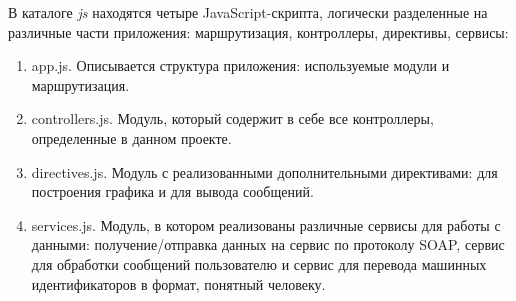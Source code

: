 В каталоге \textit{js} находятся четыре JavaScript-скрипта, логически разделенные на различные части приложения: маршрутизация, контроллеры, директивы, сервисы:
\begin{enumerate}
 \item app.js. Описывается структура приложения: используемые модули и маршрутизация.
 \item controllers.js. Модуль, который содержит в себе все контроллеры, определенные в данном проекте.
 \item directives.js. Модуль с реализованными дополнительными директивами: для построения графика и для вывода сообщений.
 \item services.js. Модуль, в котором реализованы различные сервисы для работы с данными: получение/отправка данных на сервис по протоколу SOAP, сервис для обработки сообщений пользователю и сервис для перевода машинных идентификаторов в формат, понятный человеку.
\end{enumerate}
